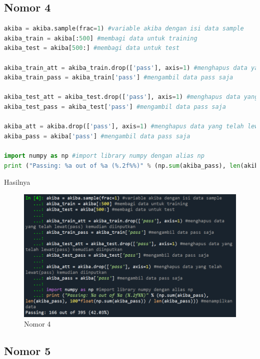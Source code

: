 \subsection{Nomor 4}

\begin{lstlisting}[language=Python]
akiba = akiba.sample(frac=1) #variable akiba dengan isi data sample
akiba_train = akiba[:500] #membagi data untuk training
akiba_test = akiba[500:] #membagi data untuk test

akiba_train_att = akiba_train.drop(['pass'], axis=1) #menghapus data yang telah lewat(pass) kemudian diinputkan
akiba_train_pass = akiba_train['pass'] #mengambil data pass saja

akiba_test_att = akiba_test.drop(['pass'], axis=1) #menghapus data yang telah lewat(pass) kemudian diinputkan
akiba_test_pass = akiba_test['pass'] #mengambil data pass saja

akiba_att = akiba.drop(['pass'], axis=1) #menghapus data yang telah lewat(pass) kemudian diinputkan
akiba_pass = akiba['pass'] #mengambil data pass saja

import numpy as np #import library numpy dengan alias np
print ("Passing: %a out of %a (%.2f%%)" % (np.sum(akiba_pass), len(akiba_pass), 100*float(np.sum(akiba_pass)) / len(akiba_pass))) #menampilkan data
\end{lstlisting}

\par Hasilnya

\begin{figure}[H]
    \centering
    \includegraphics[width=12cm]{figures/chapter2/22.PNG}
    \caption{Nomor 4}
\end{figure}

\subsection{Nomor 5}

